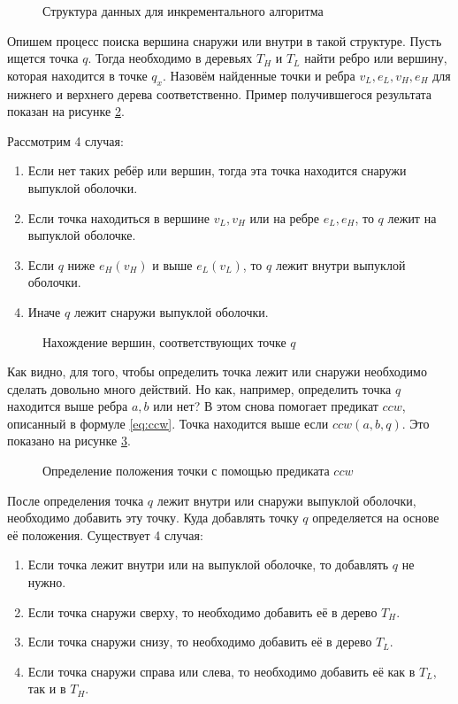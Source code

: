 \begin{figure}[ht] 
	\centering
	
	\caption{Структура данных для инкрементального алгоритма}
	\label{img:incremental_trees}
\end{figure}

Опишем процесс поиска вершина снаружи или внутри в такой структуре. Пусть ищется точка $q$. Тогда необходимо в деревьях $T_H$ и $T_L$ найти ребро или вершину, которая находится в точке $q_x$. Назовём найденные точки и ребра $v_L, e_L, v_H, e_H$ для нижнего и верхнего дерева соответственно. Пример получившегося результата показан на рисунке \ref{img:incremental_locate}.

Рассмотрим 4 случая:
\begin{enumerate}
	\item Если нет таких ребёр или вершин, тогда эта точка находится снаружи выпуклой оболочки.
	\item Если точка находиться в вершине $v_L, v_H$ или на ребре $e_L, e_H$, то $q$ лежит на выпуклой оболочке.
	\item Если $q$ ниже $e_H (v_H)$ и выше $e_L (v_L)$, то $q$ лежит внутри выпуклой оболочки.
	\item Иначе $q$ лежит снаружи выпуклой оболочки.
\end{enumerate}

\begin{figure}[H] 
	\centering
	
	\caption{Нахождение вершин, соответствующих точке $q$}
	\label{img:incremental_locate}
\end{figure}

Как видно, для того, чтобы определить точка лежит или снаружи необходимо сделать довольно много действий. Но как, например, определить точка $q$ находится выше ребра $a, b$  или нет? В этом снова помогает предикат $ccw$, описанный в формуле \ref{eq:ccw}. Точка находится выше если $ccw(a, b, q)$. Это показано на рисунке \ref{img:incremental_ccw}.

\begin{figure}[H]
	\centering
	
	\caption{Определение положения точки с помощью предиката $ccw$}
	\label{img:incremental_ccw}
\end{figure}

После определения точка $q$ лежит внутри или снаружи выпуклой оболочки, необходимо добавить эту точку. Куда добавлять точку $q$ определяется на основе её положения. Существует 4 случая:
\begin{enumerate}
	\item Если точка лежит внутри или на выпуклой оболочке, то добавлять $q$ не нужно.
	\item Если точка снаружи сверху, то необходимо добавить её в дерево $T_H$.
	\item Если точка снаружи снизу, то необходимо добавить её в дерево $T_L$.
	\item Если точка снаружи справа или слева, то необходимо добавить её как в $T_L$, так и в $T_H$.
\end{enumerate}

